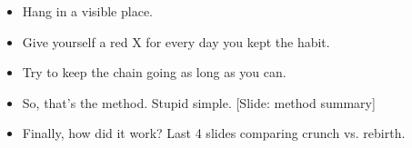 \documentclass[12pt]{article}
\begin{document}
{\begin{itemize}
\item Hang in a visible place.

\item Give yourself a red X for every day you kept the habit.

\item Try to keep the chain going as long as you can.

\item So, that's the method.  Stupid simple.  [Slide: method summary]

\item Finally, how did it work?  Last 4 slides comparing crunch vs. rebirth.



\end{itemize}

}
\end{document}
